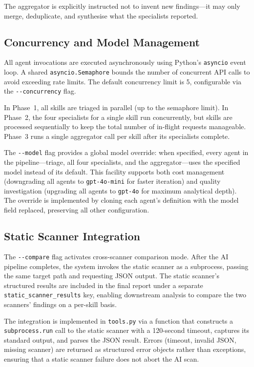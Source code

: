 The aggregator is explicitly instructed not to invent new findings---it may only merge, deduplicate, and synthesise what the specialists reported.

\subsection{Concurrency and Model Management}

All agent invocations are executed asynchronously using Python's \texttt{asyncio} event loop. A shared \texttt{asyncio.Semaphore} bounds the number of concurrent API calls to avoid exceeding rate limits. The default concurrency limit is 5, configurable via the \texttt{-{}-concurrency} flag.

In Phase~1, all skills are triaged in parallel (up to the semaphore limit). In Phase~2, the four specialists for a single skill run concurrently, but skills are processed sequentially to keep the total number of in-flight requests manageable. Phase~3 runs a single aggregator call per skill after its specialists complete.

The \texttt{-{}-model} flag provides a global model override: when specified, every agent in the pipeline---triage, all four specialists, and the aggregator---uses the specified model instead of its default. This facility supports both cost management (downgrading all agents to \texttt{gpt-4o-mini} for faster iteration) and quality investigation (upgrading all agents to \texttt{gpt-4o} for maximum analytical depth). The override is implemented by cloning each agent's definition with the model field replaced, preserving all other configuration.

\subsection{Static Scanner Integration}

The \texttt{-{}-compare} flag activates cross-scanner comparison mode. After the AI pipeline completes, the system invokes the static scanner as a subprocess, passing the same target path and requesting JSON output. The static scanner's structured results are included in the final report under a separate \texttt{static\_scanner\_results} key, enabling downstream analysis to compare the two scanners' findings on a per-skill basis.

The integration is implemented in \texttt{tools.py} via a function that constructs a \texttt{subprocess.run} call to the static scanner with a 120-second timeout, captures its standard output, and parses the JSON result. Errors (timeout, invalid JSON, missing scanner) are returned as structured error objects rather than exceptions, ensuring that a static scanner failure does not abort the AI scan.

